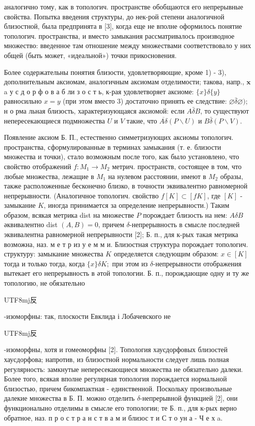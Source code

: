 \documentclass[10pt]{article}
\begin{document}
аналогично тому, как в топологич. пространстве обобщаются его непрерывные свойства. Попытка введения структуры, до нек-рой степени аналогичной близостной, была предпринята в [3], когда еще не вполне оформилось понятие топологич. пространства, и вместо замыкания рассматривалось производное множество: введенное там отношение между множествами соответствовало у них общей (быть может, «идеальной») точки прикосновения.



Более содержательны понятия близости, удовлетворяющие, кроме 1) - 3), дополнительным аксиомам, аналогичным аксиомам отделимости; такова, напр., $\mathbf{x}$ a у с д о р ф о в а б ли з о с т ь, к-рая удовлетворяет аксиоме: $\{x\} \delta\{y\}$ равносильно $x=y$ (при этом вместо 3) достаточно принять ее следствие: $\varnothing \bar{\delta} \varnothing)$; н о рма льная близость, характеризующаяся аксиомой: если $A \bar{\delta} B$, то существуют непересекающиеся подмножества $U$ и $V$ такие, что $\overline{A \delta}(P \backslash U)$ и $B \bar{\delta}(P \backslash V)$.



Появление аксиом Б. П., естественно симметризующих аксиомы топологич. пространства, сформулированные в терминах замыкания (т. е. близости множества и точки), стало возможным после того, как было установлено, что свойство отображений $f: M_{1} \rightarrow M_{2}$ метрич. пространств, состоящее в том, что любые множества, лежащие в $M_{1}$ на нулевом расстоянии, имеют в $M_{2}$ образы, также расположенные бесконечно близко, в точности эквивалентно равномерной непрерывности. (Аналогичное топологич. свойство $f[K] \subset[f K]$, где $[K]$ - замыкание $K$, иногда принимается за определение непрерывности.) Таким образом, всякая метрика dist на множестве $P$ порождает близость на нем: $A \delta B$ әквивалентно dist $(A, B)=0$, причем $\delta$-непрерывность в смысле последней эквивалентна равномерной непрерывности [2]; Б. п., для к-рых такая метрика возможна, наз. м е т р из у е м м и. Близостная структура порождает топологич. структуру: замыкание множества $K$ определяется следующим образом: $x \in[K]$ тогда и только тогда, когда $\{x\} \delta K ;$ при этом из $\delta$-непрерывности отображения вытекает его непрерывность в әтой топологии. Б. п., порождающие одну и ту же топологию, не обязательно \begin{CJK}{UTF8}{mj}反\end{CJK}-изоморфны: так, плоскости Евклида і Лобачевского не \begin{CJK}{UTF8}{mj}反\end{CJK}-изоморфны, хотя и гомеоморфны [2]. Топология хаусдорфовых близостей хаусдорфова; напротив, из близостной нормальности следует лишь полная регулярность: замкнутые непересекающиеся множества не обязательно далеки. Более того, всякая вполне регулярная топология порождается нормальной близостью, причем бикомпактная - единственной. Поскольку произвольные далекие множества в Б. П. можно отделить $\delta$-непрерывной функцией [2], они функционалыно отделимы в смысле его топологии; те Б. п., для к-рых верно обратное, наз. п р о с т р а н с т в а м и близос т и С т о ун а - Ч е х a.
\end{document}
